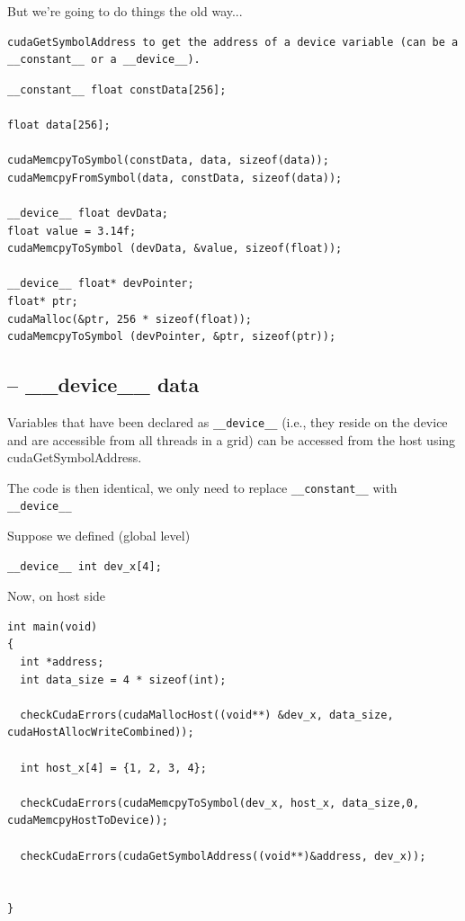 But we're going to do things the old way... 
\begin{verbatim}
cudaGetSymbolAddress to get the address of a device variable (can be a __constant__ or a __device__). 
\end{verbatim}

\begin{lstlisting}
__constant__ float constData[256];

float data[256];

cudaMemcpyToSymbol(constData, data, sizeof(data));
cudaMemcpyFromSymbol(data, constData, sizeof(data));

__device__ float devData;
float value = 3.14f;
cudaMemcpyToSymbol (devData, &value, sizeof(float));

__device__ float* devPointer;
float* ptr;
cudaMalloc(&ptr, 256 * sizeof(float));
cudaMemcpyToSymbol (devPointer, &ptr, sizeof(ptr));
\end{lstlisting}


\subsection{-- \_\_device\_\_ data}

Variables that have been declared as \verb!__device__! (i.e., they reside on the device
and are accessible from all threads in a grid) can be accessed from the host
using cudaGetSymbolAddress.

The code is then identical, we only need to replace \verb!__constant__! with \verb!__device__!

Suppose we defined (global level)
\begin{verbatim}
__device__ int dev_x[4];
\end{verbatim}

Now, on host side
\begin{verbatim}
int main(void)
{
  int *address;
  int data_size = 4 * sizeof(int);
  
  checkCudaErrors(cudaMallocHost((void**) &dev_x, data_size, cudaHostAllocWriteCombined));
  
  int host_x[4] = {1, 2, 3, 4};
  
  checkCudaErrors(cudaMemcpyToSymbol(dev_x, host_x, data_size,0, cudaMemcpyHostToDevice));
  
  checkCudaErrors(cudaGetSymbolAddress((void**)&address, dev_x));
	
  
}
\end{verbatim}



